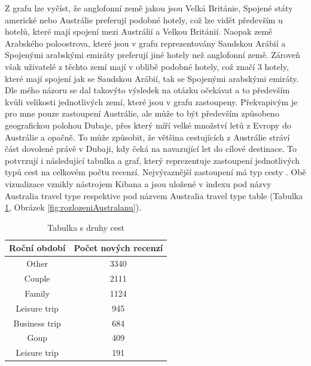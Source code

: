\documentclass[czech,BP]{thesiskiv}
\begin{document}
Z grafu lze vyčíst, že anglofonní země jakou jsou Velká Británie, Spojené státy americké nebo Austrálie preferují podobné hotely, což lze vidět především u hotelů, které mají spojení mezi Austrálií a Velkou Británií. Naopak země Arabského poloostrova, které jsou v grafu reprezentovány Saudskou Arábií a Spojenými arabskými emiráty preferují jiné hotely než anglofonní země. Zároveň však uživatelé z těchto zemí mají v oblibě podobné hotely, což značí 3 hotely, které mají spojení jak se Saudskou Arábií, tak se Spojenými arabskými emiráty. Dle mého názoru se dal takovýto výsledek na otázku očekávat a to především kvůli velikosti jednotlivých zemí, které jsou v grafu zastoupeny. Překvapivým je pro mne pouze zastoupení Austrálie, ale může to být především způsobeno geografickou polohou Dubaje, přes který míří velké množství letů z Evropy do Austrálie a opačně. To může způsobit, že většina cestujících z Austrálie stráví část dovolené právě v Dubaji, kdy čeká na navazující let do cílové destinace. To potvrzují i následující tabulka a graf, který reprezentuje zastoupení jednotlivých typů cest na celkovém počtu recenzí. Nejvýraznější zastoupení má typ cesty . Obě vizualizace vznikly nástrojem Kibana a jsou uložené v indexu  pod názvy Australia travel type respektive pod názvem Australia travel type table (Tabulka \ref{tab:rozlozeniAustralanu}, Obrázek \ref{fig:rozlozeniAustralanu}).

\begin{table}[h]
	\centering
	
	\begin{tabular}{c|c}
		
		\multicolumn{1}{l|}{\textbf{Roční období}} & \multicolumn{1}{l}{\textbf{Počet nových recenzí}} \\ \hline
		Other                                        &  3340                                              \\ 
		Couple                                        &  2111                                            \\ 
		Family                                        &  1124                                              \\ 
		Leisure trip                                      &  945                                              \\ 
		Business trip                                      &  684                                              \\ 
		Goup                                      &  409                                              \\ 
		Leisure trip                                      &  191                                              \\ 
	\end{tabular}
\caption{Tabulka s druhy cest}	\label{tab:rozlozeniAustralanu}
\end{table}
\end{document}
